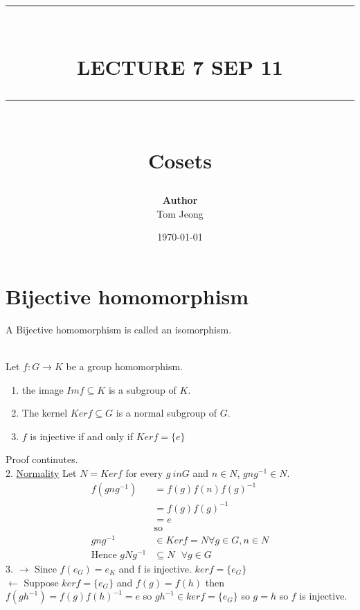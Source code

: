 \documentclass{article}
\newcommand{\HRule}[1]{\rule{\linewidth}{#1}}
\begin{document}

\title{ \normalsize \textsc{}
		\\ [2.0cm]
		\HRule{1.5pt} \\
		\LARGE \textbf{\uppercase{Lecture 7 sep 11}}
		\HRule{2.0pt} \\ [0.6cm] \LARGE{Cosets}
		}

\date{\today}
\author{\textbf{Author} \\ 
		Tom Jeong
        }

\maketitle
\newpage

\tableofcontents
\newpage

\section{Bijective homomorphism}
A Bijective homomorphism is called an isomorphism. 

\begin{proposition}[2.4.9] \leavevmode \\ 
    Let $f: G \rightarrow K$ be a group homomorphism. \begin{enumerate}
        \item the image $Im f \subseteq K $ is a subgroup of $K$. 
        \item The kernel $Ker f \subseteq G$ is a normal subgroup of $G$.
        \item $f$ is injective if and only if $Ker f = \{e\}$
    \end{enumerate}
\end{proposition}
Proof continutes. \\ 
2. \underline{Normality}
 Let $N = Ker f $ for every $g\ in G$ and $n \in N$, $gng^{-1} \in N$.
 \begin{align}
    f(gng^{-1}) &= f(g)f(n)f(g)^{-1} \\
    &= f(g)f(g)^{-1} \\ 
    &= e \\ 
    &\text{so } \\ 
    gng^{-1} &\in Ker f = N \forall g \in G, n \in N \\ 
    \text{Hence } gNg^{-1} &\subseteq N \text{ }\forall g \in G 
 \end{align}
3. $\rightarrow$ Since $f(e_G) = e_K$ and f is injective. $ker f= \{e_G\}$ \\
$\leftarrow$ Suppose $ker f = \{e_G\}$ and $f(g) = f(h)$ then $f(gh^{-1}) = f(g)f(h)^{-1} = e$ so $gh^{-1} \in ker f = \{e_G\}$ so $g = h$ so $f$ is injective.
\end{document}

